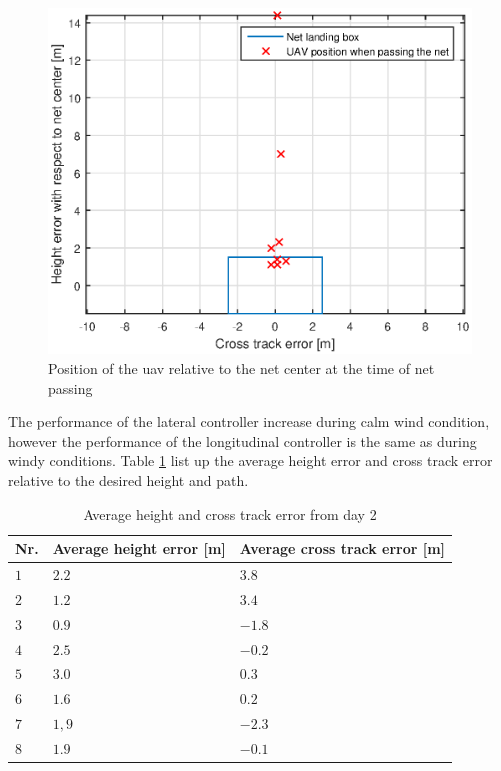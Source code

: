 \begin{figure}[H]
\centering
\includegraphics[scale=0.7]{figs/Experiment/day2NetHit.eps}
\caption{Position of the \gls{uav} relative to the net center at the time of net passing}
\label{Fig:Day2NetPass}
\end{figure}
The performance of the lateral controller increase during calm wind condition, however the performance of the longitudinal controller is the same as during windy conditions. Table \ref{Tb:AverageCrossHeightDay2} list up the average height error and cross track error relative to the desired height and path. 
\begin{table}[H]
\centering
\begin{tabular}{| l | l | l |}
\hline
\textbf{Nr.} 	& \textbf{Average height error [m]} 	& \textbf{Average cross track error [m]}  \\ \hline
$1$				& $2.2$							& $3.8$										\\ \hline
$2$				& $1.2$							& $3.4$										\\ \hline
$3$				& $0.9$							& $-1.8$									\\ \hline
$4$				& $2.5$							& $-0.2$									\\ \hline
$5$				& $3.0$							& $0.3$										\\ \hline
$6$				& $1.6$							& $0.2$										\\ \hline
$7$				& $1,9$							& $-2.3$									\\ \hline
$8$				& $1.9$							& $-0.1$									\\ \hline
\end{tabular}
\caption{Average height and cross track error from day 2}
\label{Tb:AverageCrossHeightDay2}
\end{table}
